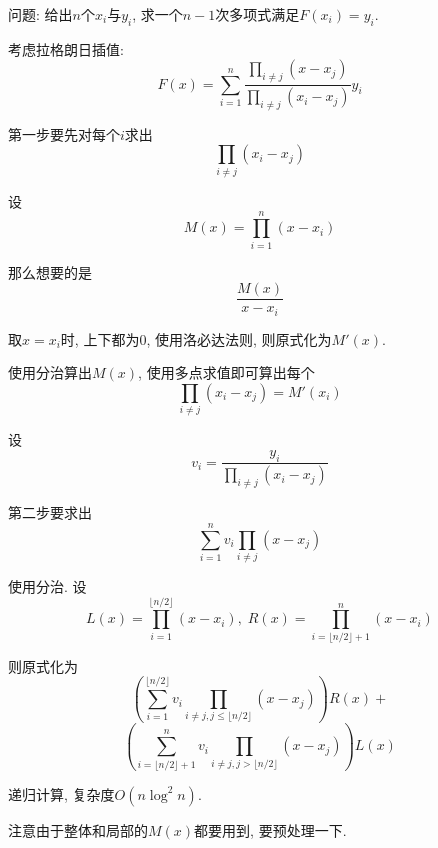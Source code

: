 问题: 给出$n$个$x_i$与$y_i$, 求一个$n-1$次多项式满足$F(x_i)=y_i$.

考虑拉格朗日插值: 
$$F(x)=\sum_{i=1}^n\frac{\prod_{i\neq j}(x-x_j)}{\prod_{i\neq j}(x_i-x_j)}y_i$$

第一步要先对每个$i$求出
$$\prod_{i\neq j}(x_i-x_j)$$

设
$$M(x)=\prod_{i=1}^{n}(x-x_i)$$

那么想要的是
$$\frac{M(x)}{x-x_i}$$

取$x=x_i$时, 上下都为0, 使用洛必达法则, 则原式化为$M'(x)$.

使用分治算出$M(x)$, 使用多点求值即可算出每个
$$\prod_{i\neq j}(x_i-x_j)=M'(x_i)$$

设
$$v_i = \frac{y_i}{\prod_{i\neq j}(x_i-x_j)}$$

第二步要求出$$\sum_{i=1}^{n}v_i\prod_{i\neq j}(x-x_j)$$

使用分治. 设
$$L(x)=\prod_{i=1}^{\lfloor n/2\rfloor}(x-x_i), \; R(x)=\prod_{i=\lfloor n/2\rfloor+1}^n(x-x_i)$$

则原式化为
$$\left( \sum_{i=1}^{\lfloor n/2\rfloor}v_i\prod_{i\neq j,j\leq\lfloor n/2\rfloor}(x-x_j)\right)R(x)+$$
$$\left( \sum_{i=\lfloor n/2\rfloor+1}^{n}v_i\prod_{i\neq j,j>\lfloor n/2\rfloor}(x-x_j)\right)L(x)$$

递归计算, 复杂度$O(n\log^2n)$.

注意由于整体和局部的$M(x)$都要用到, 要预处理一下.

\inputminted{cpp}{src/Math/快速插值.cpp}